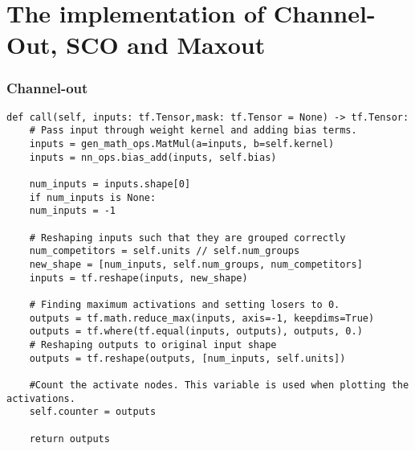 \section{The implementation of Channel-Out, \ac{SCO} and Maxout}\label{sec:TFImp}
\subsubsection*{Channel-out}
\lstset{style=Python}
\begin{lstlisting}[caption={Python implementation for the custom activation function used to define the channel-out layer.},captionpos=b, label={lst:channel_out}]
def call(self, inputs: tf.Tensor,mask: tf.Tensor = None) -> tf.Tensor:
    # Pass input through weight kernel and adding bias terms.
    inputs = gen_math_ops.MatMul(a=inputs, b=self.kernel)
    inputs = nn_ops.bias_add(inputs, self.bias)

    num_inputs = inputs.shape[0]
    if num_inputs is None:
    num_inputs = -1

    # Reshaping inputs such that they are grouped correctly
    num_competitors = self.units // self.num_groups
    new_shape = [num_inputs, self.num_groups, num_competitors]
    inputs = tf.reshape(inputs, new_shape)

    # Finding maximum activations and setting losers to 0.
    outputs = tf.math.reduce_max(inputs, axis=-1, keepdims=True)
    outputs = tf.where(tf.equal(inputs, outputs), outputs, 0.)
    # Reshaping outputs to original input shape
    outputs = tf.reshape(outputs, [num_inputs, self.units])

    #Count the activate nodes. This variable is used when plotting the activations.
    self.counter = outputs

    return outputs 
\end{lstlisting}

